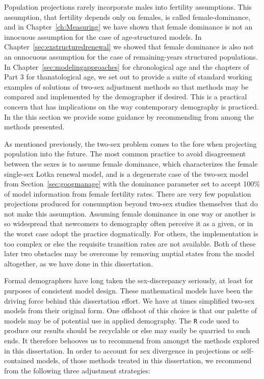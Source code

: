 
Population projections rarely incorporate males into fertility assumptions. This
assumption, that fertility depends only on females, is called female-dominance,
and in Chapter~\ref{ch:Measuring} we have shown that female dominance is not an
innocuous assumption for the case of age-structured models. In
Chapter~\ref{sec:exstructuredrenewal} we showed that female dominance is also
not an onnocuous assumption for the case of remaining-years structured
populations. In Chapter~\ref{sec:modelingapproaches} for chronological age and
the chapters of Part 3 for thanatological age, we set out to provide a suite of
standard working examples of solutions of two-sex adjustment methods so that 
methods may be compared and implemented by the demographer if desired. This 
is a practical concern that has implications on the way
contemporary demography is practiced. In the this section we provide some
guidance by recommending from among the methods presented.

As mentioned previously, the two-sex problem comes to the fore when projecting
population into the future. The most common practice to avoid disagreement between the sexes is to
assume female dominance, which characterizes the female single-sex Lotka
renewal model, and is a degenerate case of the
\citet{goodman1967age} two-sex model from Section~\ref{sec:googmanage} with the
dominance parameter set to accept 100\% of model information from female fertility rates. 
There are very few population projections produced for consumption beyond
two-sex studies themselves that do not make this assumption. Assuming female dominance
in one way or another is so widespread that newcomers to demography often 
perceive it as a given, or in the worst case adopt the
practice dogmatically. For others, the implementation is too complex or
else the requisite transition rates are not available. Both of these later
two obstacles may be overcome by removing nuptial states from the model
altogether, as we have done in this dissertation. 

Formal demographers have long taken the sex-discrepancy seriously, at
least for purposes of consistent model design. These mathematical models
have been the driving force behind this dissertation effort. We have at
times simplified two-sex models from their original form. One offshoot of
this choice is that our palette of models may be of potential use in applied
demography. The \texttt{R} code used to produce our results should be recyclable 
or else may easily be quarried to such ends. It therefore behooves us to recommend from
amongst the methods explored in this dissertation. In order to account for sex
divergence in projections or self-contained models, of those methods treated in this dissertation, 
we recommend from the following three adjustment strategies:


